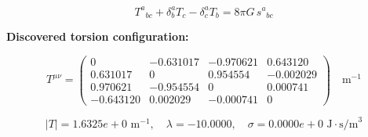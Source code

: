 
\begin{equation}
  T^a{}_{bc} + \delta^a_b T_c - \delta^a_c T_b = 8\pi G \, s^a{}_{bc}
\end{equation}

\textbf{Discovered torsion configuration:}

\begin{equation}
  T^{\mu\nu} = \begin{pmatrix}
    0 & -0.631017 & -0.970621 & 0.643120 \\
    0.631017 & 0 & 0.954554 & -0.002029 \\
    0.970621 & -0.954554 & 0 & 0.000741 \\
    -0.643120 & 0.002029 & -0.000741 & 0
  \end{pmatrix} \quad \text{m}^{-1}
\end{equation}

\begin{equation}
  |T| = 1.6325e+0 \text{ m}^{-1}, \quad
  \lambda = -10.0000, \quad
  \sigma = 0.0000e+0 \text{ J}\cdot\text{s/m}^3
\end{equation}